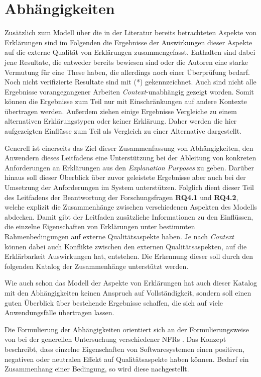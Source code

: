 \section{Abhängigkeiten}
\label{sec:model_proved_relations}

Zusätzlich zum Modell über die in der Literatur bereits betrachteten Aspekte von Erklärungen sind im Folgenden die Ergebnisse der Auswirkungen dieser Aspekte auf die externe Qualität von Erklärungen zusammengefasst. Enthalten sind dabei jene Resultate, die entweder bereits bewiesen sind oder die Autoren eine starke Vermutung für eine These haben, die allerdings noch einer Überprüfung bedarf. Noch nicht verifizierte Resultate sind mit (*) gekennzeichnet. Auch sind nicht alle Ergebnisse vorangegangener Arbeiten \textit{Context}-unabhängig gezeigt worden. Somit können die Ergebnisse zum Teil nur mit Einschränkungen auf andere Kontexte übertragen werden. Außerdem ziehen einige Ergebnisse Vergleiche zu einem alternativen Erklärungstypen oder keiner Erklärung. Daher werden die hier aufgezeigten Einflüsse zum Teil als Vergleich zu einer Alternative dargestellt. %

Generell ist einerseits das Ziel dieser Zusammenfassung von Abhängigkeiten, den Anwendern dieses Leitfadens eine Unterstützung bei der Ableitung von konkreten Anforderungen an Erklärungen aus den \textit{Explanation Purposes} zu geben. Darüber hinaus soll dieser Überblick über zuvor geleistete Ergebnisse aber auch bei der Umsetzung der Anforderungen im System unterstützen. Folglich dient dieser Teil des Leitfadens der Beantwortung der Forschungsfragen \textbf{RQ4.1} und \textbf{RQ4.2}, welche explizit die Zusammenhänge zwischen verschiedenen Aspekten des Modells abdecken. Damit gibt der Leitfaden zusätzliche Informationen zu den Einflüssen, die einzelne Eigenschaften von Erklärungen unter bestimmten Rahmenbedingungen auf externe Qualitätsaspekte haben. Je nach \textit{Context} können dabei auch Konflikte zwischen den externen Qualitätsaspekten, auf die Erklärbarkeit Auswirkungen hat, entstehen. Die Erkennung dieser soll durch den folgenden Katalog der Zusammenhänge unterstützt werden.

Wie auch schon das Modell der Aspekte von Erklärungen hat auch dieser Katalog mit den Abhängigkeiten keinen Anspruch auf Vollständigkeit, sondern soll einen guten Überblick über bestehende Ergebnisse schaffen, die sich auf viele Anwendungsfälle übertragen lassen.

Die Formulierung der Abhängigkeiten orientiert sich an der Formulierungsweise von \citeauthor{carvalho2020developers} bei der generellen Untersuchung verschiedener NFRs \cite{carvalho2020developers}. Das Konzept beschreibt, dass einzelne Eigenschaften von Softwaresystemen einen positiven, negativen oder neutralen Effekt auf Qualitätsaspekte haben können. Bedarf ein Zusammenhang einer Bedingung, so wird diese nachgestellt.

